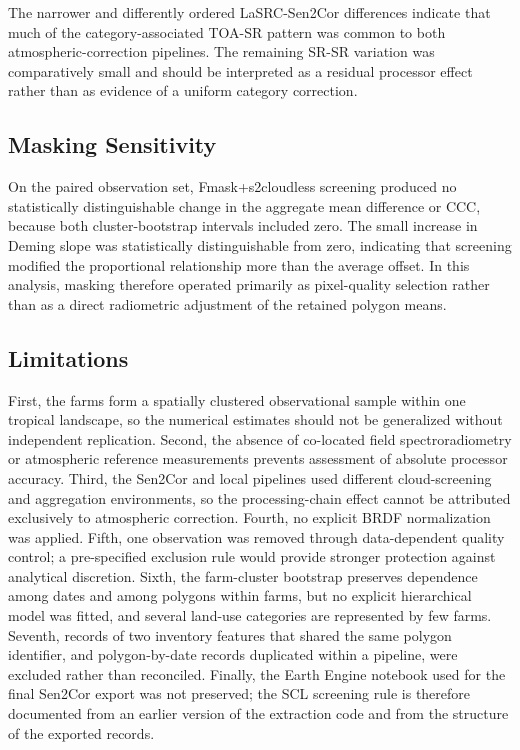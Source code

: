 \documentclass[
  authoryear,
  preprint]{elsarticle}
\begin{document}
The narrower and differently ordered LaSRC-Sen2Cor differences indicate
that much of the category-associated TOA-SR pattern was common to both
atmospheric-correction pipelines. The remaining SR-SR variation was
comparatively small and should be interpreted as a residual processor
effect rather than as evidence of a uniform category correction.

\subsection{Masking Sensitivity}\label{sec-disc-masking}

On the paired observation set, Fmask+s2cloudless screening produced no
statistically distinguishable change in the aggregate mean difference or
CCC, because both cluster-bootstrap intervals included zero. The small
increase in Deming slope was statistically distinguishable from zero,
indicating that screening modified the proportional relationship more
than the average offset. In this analysis, masking therefore operated
primarily as pixel-quality selection rather than as a direct radiometric
adjustment of the retained polygon means.

\subsection{Limitations}\label{sec-limitations}

First, the farms form a spatially clustered observational sample within
one tropical landscape, so the numerical estimates should not be
generalized without independent replication. Second, the absence of
co-located field spectroradiometry or atmospheric reference measurements
prevents assessment of absolute processor accuracy. Third, the Sen2Cor
and local pipelines used different cloud-screening and aggregation
environments, so the processing-chain effect cannot be attributed
exclusively to atmospheric correction. Fourth, no explicit BRDF
normalization was applied. Fifth, one observation was removed through
data-dependent quality control; a pre-specified exclusion rule would
provide stronger protection against analytical discretion. Sixth, the
farm-cluster bootstrap preserves dependence among dates and among
polygons within farms, but no explicit hierarchical model was fitted,
and several land-use categories are represented by few farms. Seventh,
records of two inventory features that shared the same polygon
identifier, and polygon-by-date records duplicated within a pipeline,
were excluded rather than reconciled. Finally, the Earth Engine notebook
used for the final Sen2Cor export was not preserved; the SCL screening
rule is therefore documented from an earlier version of the extraction
code and from the structure of the exported records.
\end{document}
